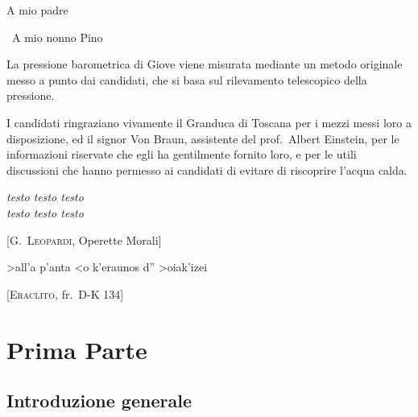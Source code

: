 \documentclass[%
    corpo=13pt,
    twoside,
    oldstyle,
    autoretitolo,
    greek,
    evenboxes,
]{toptesi}
\begin{document}
%
{\tomo
  \paginavuota
    \begin{dedica}
        A mio padre

        \textdagger\ A mio nonno Pino
    \end{dedica}
}{%
    \frontespizio %
}

\sommario

La pressione barometrica di Giove viene misurata
mediante un metodo originale  messo a punto dai candidati, che si basa
sul rilevamento telescopico della pressione.


\ringraziamenti

I candidati ringraziano vivamente il Granduca di Toscana per i mezzi
messi loro a disposizione, ed il signor Von Braun, assistente del
prof.~Albert Einstein, per le informazioni riservate che egli ha
gentilmente fornito loro, e per le utili discussioni che hanno permesso
ai candidati di evitare di riscoprire l'acqua calda.

\tablespagetrue\figurespagetrue %
\indici

\ifclassica   
\begin{citazioni}
        \textit{testo testo testo\\testo testo testo}

        [\textsc{G.\ Leopardi}, Operette Morali]\vspace{1em}

        \textgreek{>all'a p'anta <o k'eraunos d'' >oiak'izei}

        [\textsc{Eraclito}, fr.\ D-K 134]
    \end{citazioni}

\fi
\mainmatter

\part{Prima Parte}
\chapter{Introduzione generale}
\end{document}
